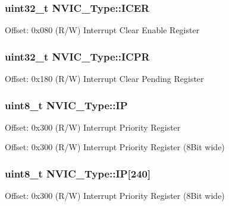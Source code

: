 \subsubsection[{\texorpdfstring{I\+C\+ER}{ICER}}]{ uint32\+\_\+t N\+V\+I\+C\+\_\+\+Type\+::\+I\+C\+ER}\hypertarget{structNVIC__Type_a856fba9cb1acc608fc03d8f2451bb16a}{}\label{structNVIC__Type_a856fba9cb1acc608fc03d8f2451bb16a}
Offset\+: 0x080 (R/W) Interrupt Clear Enable Register 
\subsubsection[{\texorpdfstring{I\+C\+PR}{ICPR}}]{ uint32\+\_\+t N\+V\+I\+C\+\_\+\+Type\+::\+I\+C\+PR}\hypertarget{structNVIC__Type_a7483899bfdf859f059384dd9aacd0072}{}\label{structNVIC__Type_a7483899bfdf859f059384dd9aacd0072}
Offset\+: 0x180 (R/W) Interrupt Clear Pending Register 
\subsubsection[{\texorpdfstring{IP}{IP}}]{ uint8\+\_\+t N\+V\+I\+C\+\_\+\+Type\+::\+IP}\hypertarget{structNVIC__Type_aa7d4c60e9bbf4b3d07a6b3ba39a7d7d9}{}\label{structNVIC__Type_aa7d4c60e9bbf4b3d07a6b3ba39a7d7d9}
Offset\+: 0x300 (R/W) Interrupt Priority Register

Offset\+: 0x300 (R/W) Interrupt Priority Register (8\+Bit wide) 
\subsubsection[{\texorpdfstring{IP}{IP}}]{ uint8\+\_\+t N\+V\+I\+C\+\_\+\+Type\+::\+IP\mbox{[}240\mbox{]}}\hypertarget{structNVIC__Type_a6524789fedb94623822c3e0a47f3d06c}{}\label{structNVIC__Type_a6524789fedb94623822c3e0a47f3d06c}
Offset\+: 0x300 (R/W) Interrupt Priority Register (8\+Bit wide) 
